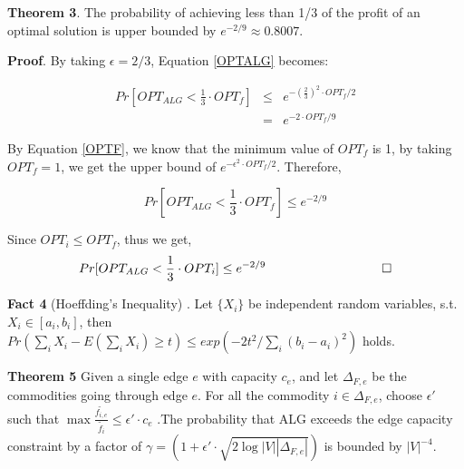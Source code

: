 \documentclass[conference]{IEEEtran}
\newcommand*{\QEDB}{\hfill\ensuremath{\square}}%
\begin{document}
\textbf{Theorem 3}. The probability of achieving less than 1/3 of the profit of an optimal solution is upper bounded by $e^{-2/9} \approx 0.8007$.

\textbf{Proof}.
By taking $\epsilon = 2/3$, Equation \ref{OPTALG} becomes:

\begin{eqnarray}
Pr[OPT_{ALG}  < \frac{1}{3} \cdot OPT_f] &\le& e^{-(\frac{2}{3})^2 \cdot OPT_f / 2} \\
&=& e^{-2 \cdot OPT_f/9}
\end{eqnarray}

By Equation \ref{OPTF}, we know that the minimum value of $OPT_f$ is 1, by taking $OPT_f = 1$, we get the upper bound of $e^{-\epsilon^2 \cdot OPT_f / 2}$. Therefore,

\begin{equation}
Pr[OPT_{ALG}  < \frac{1}{3} \cdot OPT_f] \le e^{-2/9}
\end{equation}

Since $OPT_i \le OPT_f$, thus we get, 
\begin{equation}
Pr[OPT_{ALG}  < \frac{1}{3} \cdot OPT_i] \le e^{-2/9}
\,\,\,\,\,\,\,\,\,\,\,\,\,\,\,\,\,\,\,\,\,\,\,\,\,\,\,\,\,\,\,\,\,\,\,\,\,\,\,\,\,\,\,\,\,\,\,\,\,\,\,\,\,\,\,\QEDB \nonumber
\end{equation}



%

\vspace*{0.15in}
\textbf{Fact 4} (Hoeffding's Inequality)\cite{Devdatt} . Let $\{X_i\}$ be independent random variables, s.t. $X_i \in [a_i, b_i]$, then $Pr(\sum_{i}X_i - E(\sum_{i}X_i ) \ge t) \le exp(-2t^2 / \sum_{i}(b_i-a_i)^2 )$ holds.

\vspace*{0.15in}
\textbf{Theorem 5} Given a single edge $e$ with capacity $c_e$, and let $\Delta_{F,e}$ be the commodities going through edge $e$. For all the commodity $i \in \Delta_{F,e}$, choose $\epsilon'$ such that $\max \frac{\tilde{f_{i,e}}}{\tilde{f_i}} \le \epsilon' \cdot c_e$ .The probability that ALG exceeds the edge capacity constraint by a factor of $\gamma = (1+\epsilon' \cdot \sqrt{2\log|V||\Delta_{F,e}|})$ is bounded by $|V|^{-4}$.
\vspace*{0.15in}
\end{document}
